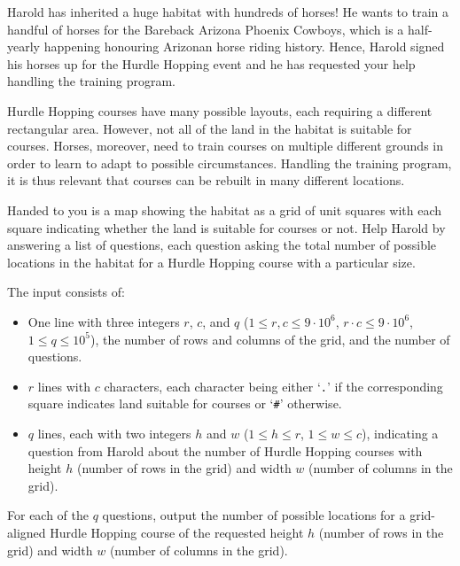 \problemname{}


\newcommand{\maxsize}{9 \cdot 10^6}
\newcommand{\maxq}{10^5}

Harold has inherited a huge habitat with hundreds of horses!
He wants to train a handful of horses for the Bareback Arizona Phoenix Cowboys, which is a half-yearly happening honouring Arizonan horse riding history.
Hence, Harold signed his horses up for the Hurdle Hopping event and he has requested your help handling the training program.

Hurdle Hopping courses have many possible layouts, each requiring a different rectangular area.
However, not all of the land in the habitat is suitable for courses.
Horses, moreover, need to train courses on multiple different grounds in order to learn to adapt to possible circumstances.
Handling the training program, it is thus relevant that courses can be rebuilt in many different locations.

Handed to you is a map showing the habitat as a grid of unit squares with each square indicating whether the land is suitable for courses or not.
Help Harold by answering a list of questions,
each question asking the total number of possible locations in the habitat
for a Hurdle Hopping course with a particular size.

\begin{Input}
    The input consists of:
    \begin{itemize}
        \item One line with three integers $r$, $c$, and $q$
            ($1 \leq r,c \leq \maxsize$, $r \cdot c \leq \maxsize$, $1 \leq q \leq \maxq$),
            the number of rows and columns of the grid,
            and the number of questions.
        \item $r$ lines with $c$ characters, each character being either `\texttt{.}' if the corresponding square indicates land suitable for courses or `\texttt{\#}' otherwise.
        \item $q$ lines, each with two integers $h$ and $w$ ($1 \leq h \leq r$, $1 \leq w \leq c$),
            indicating a question from Harold about the number of Hurdle Hopping courses with
            height $h$ (number of rows in the grid) and width $w$ (number of columns in the grid).
    \end{itemize}
\end{Input}

\begin{Output}
    For each of the $q$ questions,
    output the number of possible locations for a grid-aligned Hurdle Hopping course of the requested
    height $h$ (number of rows in the grid) and width $w$ (number of columns in the grid).
\end{Output}

